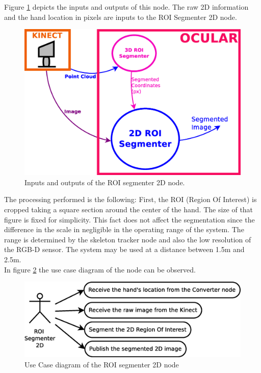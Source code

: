 	Figure \ref{node_roi2d} depicts the inputs and outputs of this node. 
	The raw 2D information and the hand location in pixels are inputs to the ROI Segmenter 2D node. 

		\begin{figure}[H]
			\begin{center}
			\includegraphics[width=0.5\linewidth]{img/diagrams/node_roi2d.eps}
			\caption[ROI segmenter 2D node I/O]{Inputs and outputs of the ROI segmenter 2D node.}		
			\label{node_roi2d}
			\end{center}
		\end{figure}

	The processing performed is the following: First, the ROI (Region Of Interest) is cropped taking a square section around the center of the hand. 
	The size of that figure is fixed for simplicity. 
	This fact does not affect the segmentation since the difference in the scale in negligible in the operating range of the system. 
	The range is determined by the skeleton tracker node and also the low resolution of the RGB-D sensor. 
	The system may be used at a distance between 1.5m and 2.5m. 
	\\
	In figure \ref{uc_roi2d} the use case diagram of the node can be observed.
	\begin{figure}[H]
		\centering
			\includegraphics[scale=0.4]{img/diagrams/uc_roi_segmenter_2d.eps}
			\caption[Use case diagram ROI segmenter 2D node]{Use Case diagram of the ROI segmenter 2D node}
		\label{uc_roi2d}
	\end{figure}

